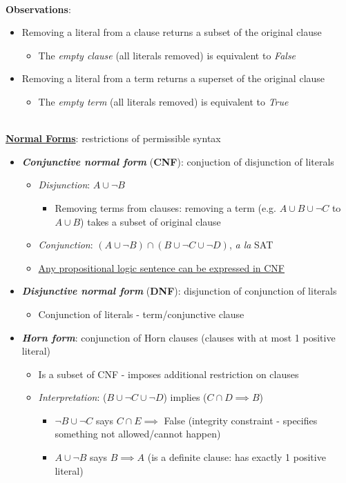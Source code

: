 \documentclass[12pt]{extarticle}
\theoremstyle{definition}
\theoremstyle{remark}
\newcommand{\pstart}[0]{\noindent}
\newcommand{\newp}[0]{~\\ \pstart}
\newcommand{\term}[1]{\noindent\textbf{\textit{#1}}}
\newcommand{\titleul}[1]{\noindent \textbf{\ul{#1}}}
\begin{document}
\newp
\textbf{Observations}: \begin{itemize}
    \item Removing a literal from a clause returns a subset of the original clause \begin{itemize}
        \item The \textit{empty clause} (all literals removed) is equivalent to \textit{False}
    \end{itemize}
    \item Removing a literal from a term returns a superset of the original clause \begin{itemize}
        \item The \textit{empty term} (all literals removed) is equivalent to \textit{True}
    \end{itemize}
\end{itemize}

~\\
\pstart
\titleul{Normal Forms}: restrictions of permissible syntax \begin{itemize}
    \item \term{Conjunctive normal form} (\textbf{CNF}): conjuction of disjunction of literals \begin{itemize}
        \item \textit{Disjunction}: $A\cup\neg B$ \begin{itemize}
            \item Removing terms from clauses: removing a term (e.g. $A\cup B\cup \neg C$ to $A\cup B$) takes a subset of original clause
        \end{itemize}
        \item \textit{Conjunction}: $(A\cup\neg B)\cap(B\cup\neg C\cup\neg D)$, \textit{a la} SAT
        \item \ul{Any propositional logic sentence can be expressed in CNF}
    \end{itemize}
    \item \term{Disjunctive normal form} (\textbf{DNF}): disjunction of conjunction of literals \begin{itemize}
        \item Conjunction of literals - term/conjunctive clause
    \end{itemize}
    \item \term{Horn form}: conjunction of Horn clauses (clauses with at most 1 positive literal) \begin{itemize}
        \item Is a subset of CNF - imposes additional restriction on clauses
        \item \textit{Interpretation}: ($B\cup\neg C\cup\neg D$) implies ($C\cap D\implies B$) \begin{itemize}
            \item $\neg B\cup\neg C$ says $C\cap E\implies$ False (integrity constraint - specifies something not allowed/cannot happen)
            \item $A\cup\neg B$ says $B\implies A$ (is a definite clause: has exactly 1 positive literal)
        \end{itemize}
    \end{itemize}
\end{itemize}
\end{document}

